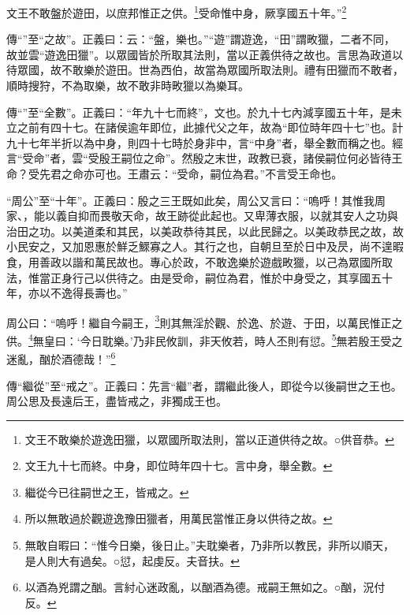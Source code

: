 文王不敢盤於遊田，以庶邦惟正之供。\footnote{文王不敢樂於遊逸田獵，以眾國所取法則，當以正道供待之故。○供音恭。}受命惟中身，厥享國五十年。”\footnote{文王九十七而終。中身，即位時年四十七。言中身，舉全數。}

{\noindent\zhuan{}\fzbyks 傳“”至“之故”。正義曰：云：“盤，樂也。”“遊”謂遊逸，“田”謂畋獵，二者不同，故並雲“遊逸田獵”。以眾國皆於所取其法則，當以正義供待之故也。言思為政道以待眾國，故不敢樂於遊田。世為西伯，故當為眾國所取法則。禮有田獵而不敢者，順時搜狩，不為取樂，故不敢非時畋獵以為樂耳。 \par}

{\noindent\zhuan{}\fzbyks 傳“”至“全數”。正義曰：“年九十七而終”，文也。於九十七內減享國五十年，是未立之前有四十七。在諸侯逾年即位，此據代父之年，故為“即位時年四十七”也。計九十七年半折以為中身，則四十七時於身非中，言“中身”者，舉全數而稱之也。經言“受命”者，雲“受殷王嗣位之命”。然殷之末世，政教已衰，諸侯嗣位何必皆待王命？受先君之命亦可也。王肅云：“受命，嗣位為君。”不言受王命也。 \par}

{\noindent\shu{}\fzkt “周公”至“十年”。正義曰：殷之三王既如此矣，周公又言曰：“嗚呼！其惟我周家、，能以義自抑而畏敬天命，故王跡從此起也。又卑薄衣服，以就其安人之功與治田之功。以美道柔和其民，以美政恭待其民，以此民歸之。以美政恭民之故，故小民安之，又加恩惠於鮮乏鰥寡之人。其行之也，自朝旦至於日中及昃，尚不遑暇食，用善政以諧和萬民故也。專心於政，不敢逸樂於遊戲畋獵，以己為眾國所取法，惟當正身行己以供待之。由是受命，嗣位為君，惟於中身受之，其享國五十年，亦以不逸得長壽也。” \par}

周公曰：“嗚呼！繼自今嗣王，\footnote{繼從今已往嗣世之王，皆戒之。}則其無淫於觀、於逸、於遊、于田，以萬民惟正之供。\footnote{所以無敢過於觀遊逸豫田獵者，用萬民當惟正身以供待之故。}無皇曰：‘今日耽樂。’乃非民攸訓，非天攸若，時人丕則有愆。\footnote{無敢自暇曰：“惟今日樂，後日止。”夫耽樂者，乃非所以教民，非所以順天，是人則大有過矣。○愆，起虔反。夫音扶。}無若殷王受之迷亂，酗於酒德哉！”\footnote{以酒為兇謂之酗。言紂心迷政亂，以酗酒為德。戒嗣王無如之。○酗，況付反。}


{\noindent\zhuan{}\fzbyks 傳“繼從”至“戒之”。正義曰：先言“繼”者，謂繼此後人，即從今以後嗣世之王也。周公思及長遠后王，盡皆戒之，非獨成王也。 \par}

